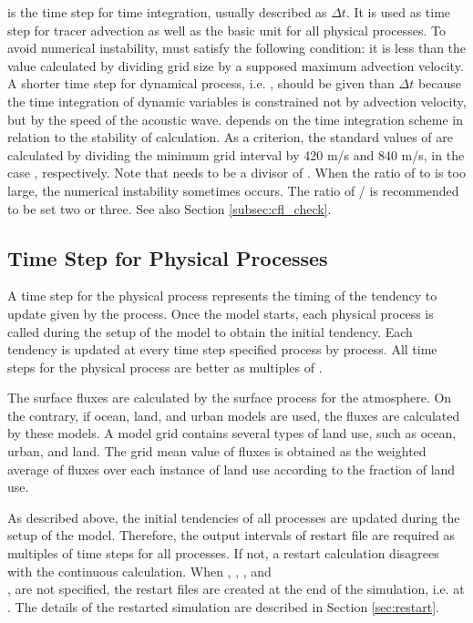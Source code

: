  is the time step for time integration, usually described as $\Delta t$. It is used as time step for tracer advection as well as the basic unit for all physical processes. To avoid numerical instability,  must satisfy the following condition: it is less than the value calculated by dividing grid size by a supposed maximum advection velocity. A shorter time step for dynamical process, i.e. , should be given than $\Delta t$ because the time integration of dynamic variables is constrained not by advection velocity, but by the speed of the acoustic wave.
 depends on the time integration scheme in relation to the stability of calculation. As a criterion, the standard values of  are calculated by dividing the minimum grid interval by 420 m/s and 840 m/s, in the case , respectively.
Note that  needs to be a divisor of .
When the ratio of  to  is too large,
the numerical instability sometimes occurs.
The ratio of / is recommended to be set two or three.
See also Section \ref{subsec:cfl_check}.


\subsection{Time Step for Physical Processes}
A time step for the physical process represents the timing of the tendency to update given by the process. Once the model starts, each physical process is called during the setup of the model to obtain the initial tendency. Each tendency is updated at every time step specified process by process. All time steps for the physical process are better as multiples of .

The surface fluxes are calculated by the surface process for the atmosphere. On the contrary, if ocean, land, and urban models are used, the fluxes are calculated by these models. A model grid contains several types of land use, such as ocean, urban, and land. The grid mean value of fluxes is obtained as the weighted average of fluxes over each instance of land use according to the fraction of land use.

As described above, the initial tendencies of all processes are updated during the setup of the model. Therefore, the output intervals of restart file are required as multiples of time steps for all processes. If not, a restart calculation disagrees with the continuous calculation. When , ,  , and\\ , are not specified, the restart files are created at the end of the simulation, i.e. at . The details of the restarted simulation are described in Section \ref{sec:restart}.



